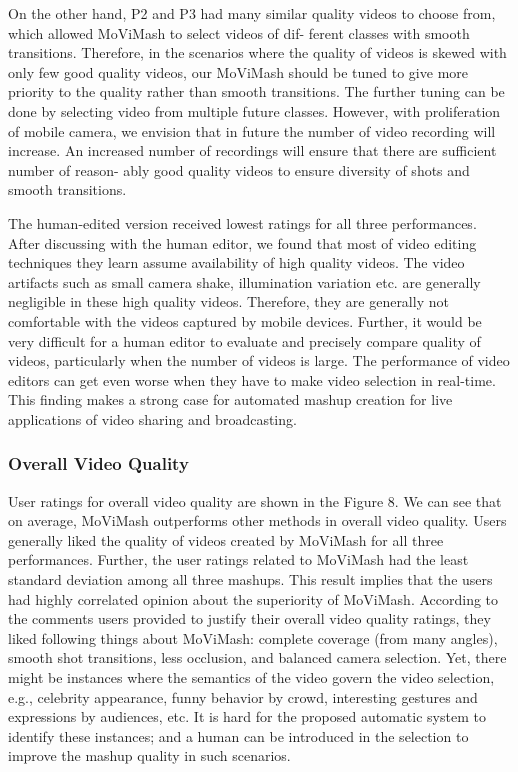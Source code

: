 \documentclass{sig-alternate-05-2015}
\begin{document}
On the other hand, P2 and P3 had many similar quality videos
to choose from, which allowed MoViMash to select videos of dif-
ferent classes with smooth transitions. Therefore, in the scenarios
where the quality of videos is skewed with only few good quality
videos, our MoViMash should be tuned to give more priority to
the quality rather than smooth transitions. The further tuning can
be done by selecting video from multiple future classes. However,
with proliferation of mobile camera, we envision that in future the
number of video recording will increase. An increased number of
recordings will ensure that there are sufficient number of reason-
ably good quality videos to ensure diversity of shots and smooth
transitions.

The human-edited version received lowest ratings for all three
performances. After discussing with the human editor, we found
that most of video editing techniques they learn assume availability
of high quality videos. The video artifacts such as small camera
shake, illumination variation etc. are generally negligible in these
high quality videos. Therefore, they are generally not comfortable
with the videos captured by mobile devices. Further, it would be
very difficult for a human editor to evaluate and precisely compare
quality of videos, particularly when the number of videos is large.
The performance of video editors can get even worse when they
have to make video selection in real-time. This finding makes a
strong case for automated mashup creation for live applications of
video sharing and broadcasting.
\subsubsection{Overall Video Quality}
User ratings for overall video quality are shown in the Figure 8.
We can see that on average, MoViMash outperforms other methods in overall video quality. Users generally liked the quality of
videos created by MoViMash for all three performances. Further,
the user ratings related to MoViMash had the least standard deviation among all three mashups. This result implies that the users
had highly correlated opinion about the superiority of MoViMash.
According to the comments users provided to justify their overall
video quality ratings, they liked following things about MoViMash:
complete coverage (from many angles), smooth shot transitions,
less occlusion, and balanced camera selection. Yet, there might
be instances where the semantics of the video govern the video
selection, e.g., celebrity appearance, funny behavior by crowd, interesting gestures and expressions by audiences, etc. It is hard for
the proposed automatic system to identify these instances; and a
human can be introduced in the selection to improve the mashup
quality in such scenarios.
\end{document}
